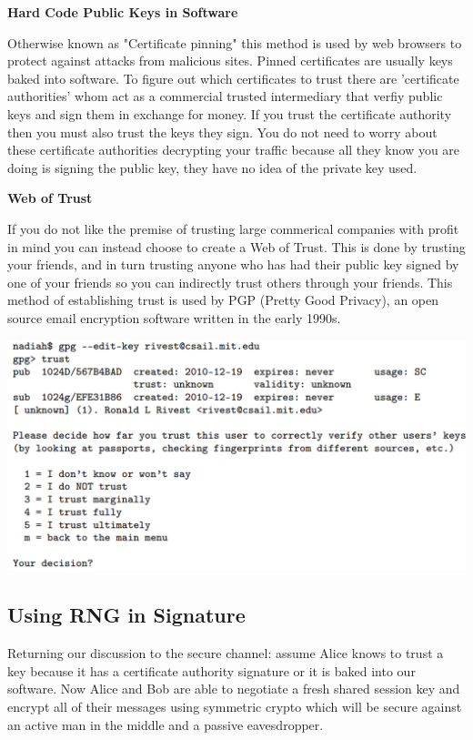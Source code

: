 \documentclass[11pt]{article} %
\begin{document}
\bigskip
{\parindent0pt \textbf{Hard Code Public Keys in Software}}

\smallskip
{\parindent0pt Otherwise known as "Certificate pinning" this method is used by
web browsers to protect against attacks from malicious sites.  Pinned
certificates are usually keys baked into software.  To figure out which
certificates to trust there are 'certificate authorities' whom act as a
commercial trusted intermediary that verfiy public keys and sign them in
exchange for money.  If you trust the certificate authority then you must also
trust the keys they sign.  You do not need to worry about these certificate
authorities decrypting your traffic because all they know you are doing is
signing the public key, they have no idea of the private key used.}

\bigskip
{\parindent0pt \textbf{Web of Trust}}

\smallskip
{\parindent0pt If you do not like the premise of trusting large commerical companies with
profit in mind you can instead choose to create a Web of Trust. This is done  by
trusting your friends, and in turn trusting anyone who has had their public key
signed by one of your friends so you can indirectly trust others through your
friends.  This method of establishing trust is used by PGP (Pretty Good
Privacy), an open source email encryption software written in the
early 1990s.}

\bigskip

\begin{center}
	\includegraphics[scale=0.55]{./Trust-in-keys2.png}
\end{center}
  
  
\subsection{Using RNG in Signature}

Returning our discussion to the secure channel: assume Alice knows to trust a key because it has a certificate authority signature or it is baked into our software. Now Alice and Bob are able to negotiate a fresh shared session key and encrypt all of their messages using symmetric crypto which will be secure against an active man in the middle and a passive eavesdropper.\\
\end{document}
